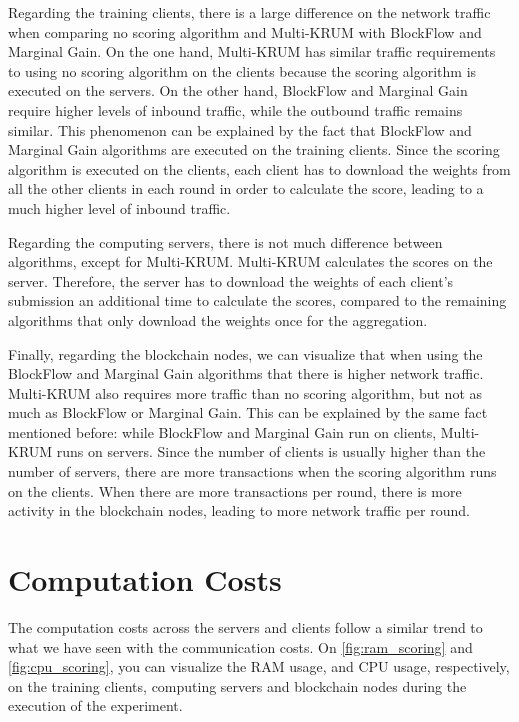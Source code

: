 Regarding the training clients, there is a large difference on the network traffic when comparing no scoring algorithm and Multi-KRUM with BlockFlow and Marginal Gain. On the one hand, Multi-KRUM has similar traffic requirements to using no scoring algorithm on the clients because the scoring algorithm is executed on the servers. On the other hand, BlockFlow and Marginal Gain require higher levels of inbound traffic, while the outbound traffic remains similar. This phenomenon can be explained by the fact that BlockFlow and Marginal Gain algorithms are executed on the training clients. Since the scoring algorithm is executed on the clients, each client has to download the weights from all the other clients in each round in order to calculate the score, leading to a much higher level of inbound traffic.

Regarding the computing servers, there is not much difference between algorithms, except for Multi-KRUM. Multi-KRUM calculates the scores on the server. Therefore, the server has to download the weights of each client's submission an additional time to calculate the scores, compared to the remaining algorithms that only download the weights once for the aggregation.

Finally, regarding the blockchain nodes, we can visualize that when using the BlockFlow and Marginal Gain algorithms that there is higher network traffic. Multi-KRUM also requires more traffic than no scoring algorithm, but not as much as BlockFlow or Marginal Gain. This can be explained by the same fact mentioned before: while BlockFlow and Marginal Gain run on clients, Multi-KRUM runs on servers. Since the number of clients is usually higher than the number of servers, there are more transactions when the scoring algorithm runs on the clients. When there are more transactions per round, there is more activity in the blockchain nodes, leading to more network traffic per round.

\section{Computation Costs}

The computation costs across the servers and clients follow a similar trend to what we have seen with the communication costs. On \autoref{fig:ram_scoring} and \autoref{fig:cpu_scoring}, you can visualize the RAM usage, and CPU usage, respectively, on the training clients, computing servers and blockchain nodes during the execution of the experiment.

